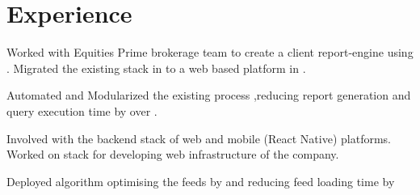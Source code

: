 \documentclass[]{deedy-resume-openfont}
\begin{document}
\begin{minipage}[t]{0.35\textwidth}
\sectionsep

%
%

\end{minipage} 
\hfill
\begin{minipage}[t]{0.64\textwidth} 


\section{Experience}

\vspace{\topsep} %
\begin{tightemize}\item Worked with Equities Prime brokerage team to create a client report-engine using . Migrated the existing stack in  to a web based platform in .
\end{tightemize}
\begin{tightemize}\item Automated and Modularized the existing process ,reducing report generation and query execution time by over .
\end{tightemize}
\sectionsep
{}
\begin{tightemize}\item Involved with the backend stack of web and mobile (React Native) platforms. Worked on  stack for developing web infrastructure of the company.
\end{tightemize}
\begin{tightemize}\item Deployed  algorithm optimising the feeds by  and reducing feed loading time by 
\end{tightemize}
\sectionsep
{}

\end{minipage}
\end{document}
